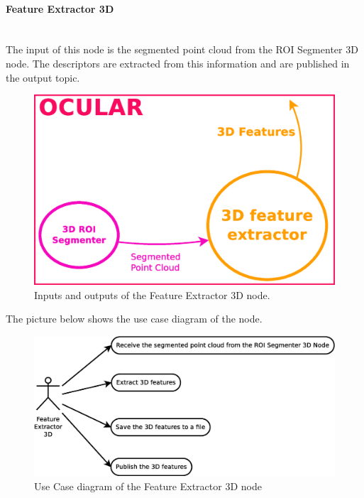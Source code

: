 
\paragraph{Feature Extractor 3D}\mbox{}\\

	The input of this node is the segmented point cloud from the ROI Segmenter 3D node. The descriptors are extracted from this information and are published in the output topic. 
	\\
		\begin{figure}[H]
			\begin{center}
			\includegraphics[width=0.5\linewidth]{img/diagrams/node_fe3d.eps}
			\caption[Feature Extractor 3D node I/O]{Inputs and outputs of the Feature Extractor 3D node.}		
			\label{node_fe3d}
			\end{center}
		\end{figure}

	The picture below shows the use case diagram of the node. 

	\begin{figure}[H]
		\centering
			\includegraphics[scale=0.4]{img/diagrams/uc_feature_extractor_3d.eps}
			\caption[Use case diagram Feature Extractor 3D node]{Use Case diagram of the Feature Extractor 3D node}
		
	\end{figure}


